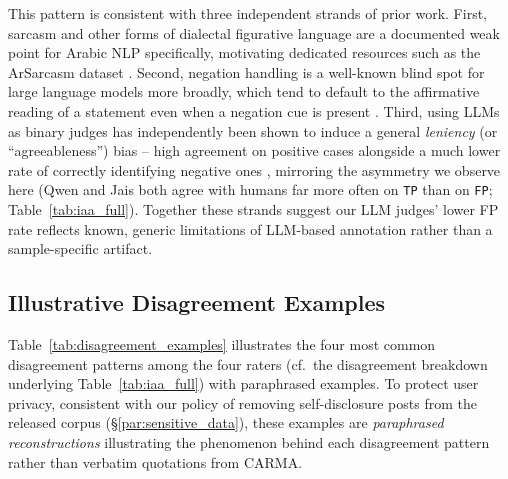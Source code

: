 \documentclass[letterpaper]{article} %
\begin{document}
This pattern is consistent with three independent strands of prior
work. First, sarcasm and other forms of dialectal figurative language
are a documented weak point for Arabic NLP specifically, motivating
dedicated resources such as the ArSarcasm dataset
\citep{abu-farha-magdy-2020-arabic}. Second, negation handling is a
well-known blind spot for large language models more broadly, which
tend to default to the affirmative reading of a statement even when a
negation cue is present \citep{garcia-ferrero-etal-2023-not}. Third,
using LLMs as binary judges has independently been shown to induce a
general \emph{leniency} (or ``agreeableness'') bias -- high agreement
on positive cases alongside a much lower rate of correctly identifying
negative ones \citep{jain2025beyond}, mirroring the asymmetry we
observe here (Qwen and Jais both agree with humans far more often on
\texttt{TP} than on \texttt{FP}; Table~\ref{tab:iaa_full}). Together
these strands suggest our LLM judges' lower FP rate reflects known,
generic limitations of LLM-based annotation rather than a
sample-specific artifact.

\subsection*{Illustrative Disagreement Examples}

Table~\ref{tab:disagreement_examples} illustrates the four most common
disagreement patterns among the four raters (cf.\ the disagreement
breakdown underlying Table~\ref{tab:iaa_full}) with paraphrased
examples. To protect user privacy, consistent with our policy of
removing self-disclosure posts from the released corpus
(\S\ref{par:sensitive_data}), these examples are \textit{paraphrased
reconstructions} illustrating the phenomenon behind each disagreement
pattern rather than verbatim quotations from CARMA.
\end{document}
